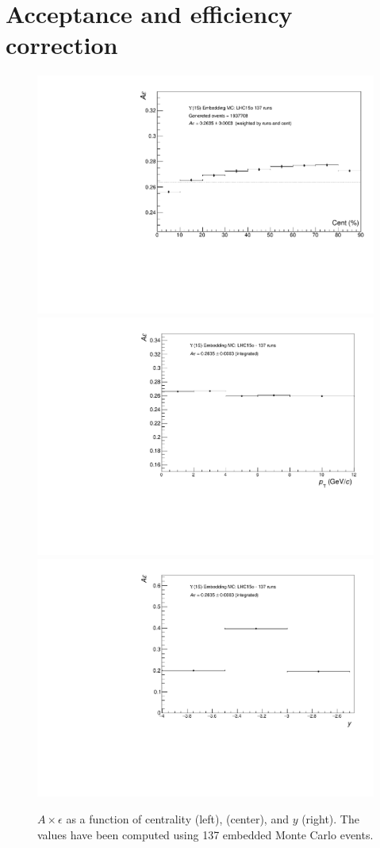 \section{Acceptance and efficiency correction}

\begin{figure}[htp]

\centering
\includegraphics[width=.5\textwidth]{Chapters/Analysis/Figs/Axe/AccEffvsCent.pdf}\hfill
\includegraphics[width=.5\textwidth]{Chapters/Analysis/Figs/Axe/AccEffvsPt.pdf}\hfill
\includegraphics[width=.5\textwidth]{Chapters/Analysis/Figs/Axe/AccEffvsY.pdf}

\caption{$A\times\epsilon$ as a function of centrality (left), \pt (center), and $y$ (right). The values have been computed using 137 embedded Monte Carlo events.}
\label{fig:Axe}

\end{figure}

